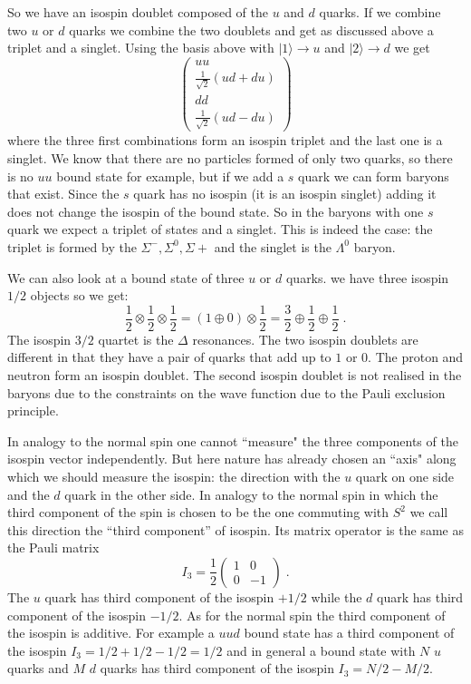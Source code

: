\documentclass[12pt]{article}
\begin{document}
So we have an isospin doublet composed of the $u$ and $d$ quarks. If we combine two $u$ or $d$ quarks we combine the two doublets and get as discussed above a triplet and a singlet. Using the basis above with $|1\rangle\rightarrow u$ and $|2\rangle\rightarrow d$ we get
\[\left(\begin{array}{c}uu\\\frac{1}{\sqrt{2}}(ud+du)\\dd\\\frac{1}{\sqrt{2}}(ud-du)\end{array}\right)\]
where the three first combinations form an isospin triplet and the last one is a singlet. We know that there are no particles formed of only two quarks, so there is no $uu$ bound state for example, but if we add a $s$ quark we can form baryons that exist. Since the $s$ quark has no isospin (it is an isospin singlet) adding it does not change the isospin of the bound state. So in the baryons with one $s$ quark we expect a triplet of states and a singlet. This is indeed the case: the triplet is formed by the $\Sigma^-,\Sigma^0,\Sigma+$ and the singlet is the $\Lambda^0$ baryon.   

We can also look at a bound state of three $u$ or $d$ quarks. we have three isospin $1/2$ objects so we get:
\[\frac{1}{2}\otimes\frac{1}{2}\otimes\frac{1}{2}=\left(1\oplus0\right)\otimes \frac{1}{2}=\frac{3}{2}\oplus\frac{1}{2}\oplus \frac{1}{2}\;.\]
The isospin $3/2$ quartet is the $\Delta$ resonances. The two isospin doublets are different in that they have a pair of quarks that add up to $1$ or $0$. The proton and neutron form an isospin doublet.  The second isospin doublet is not realised in the baryons due to the constraints on the wave function due to the Pauli exclusion principle.

In analogy to the normal spin one cannot ``measure" the three components of the isospin vector independently. But here nature has already chosen an ``axis" along which we should measure the isospin: the direction with the $u$ quark on one side and the $d$ quark in the other side. In analogy to the normal spin in which the third component of the spin is chosen to be the one commuting with $S^2$ we call this direction the ``third component'' of isospin. Its matrix operator is the same as the Pauli matrix
\[I_3=\frac{1}{2}\left(\begin{array}{cc}1&0\\0&-1\end{array}\right)\;.\]
The $u$ quark has third component of the isospin $+1/2$ while the $d$ quark has third component of the isospin $-1/2$. As for the normal spin the third component of the isospin is additive. For example a $uud$ bound state has a third component of the isospin $I_3=1/2+1/2-1/2=1/2$ and in general a bound state with $N$ $u$ quarks and $M$ $d$ quarks has third component of the isospin $I_3=N/2-M/2$.   
\end{document}
